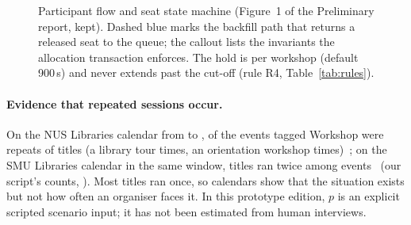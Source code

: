 \begin{figure}[tb]
  \centering
  \caption{Participant flow and seat state machine (Figure~1 of the Preliminary report, kept). Dashed
  blue marks the backfill path that returns a released seat to the queue; the callout lists the
  invariants the allocation transaction enforces. The hold is  per workshop
  (default 900\,s) and never extends past the cut-off (rule R4, Table~\ref{tab:rules}).}
  \label{fig:flow}
\end{figure}

\paragraph{Evidence that repeated sessions occur.}
On the NUS Libraries calendar from \MarketLibcalFrom{} to \MarketLibcalTo, \MarketNusLibcalRepeatEvents{}
of the \MarketNusLibcalWorkshops{} events tagged Workshop were repeats of \MarketNusLibcalRepeatTitles{}
titles (a library tour \MarketNusLibcalRepeatTitleOneEvents{} times, an orientation workshop
\MarketNusLibcalRepeatTitleTwoEvents{} times)~\cite{nus-libcal}; on the SMU Libraries calendar in the
same window, \MarketSmuLibcalRepeatTitles{} titles ran twice among \MarketSmuLibcalEvents{}
events~\cite{smu-libcal} (our script's counts, ). Most titles ran once, so calendars show that the situation exists but not
how often an organiser faces it. In this prototype edition, $p$ is an explicit scripted scenario
input; it has not been estimated from human interviews.

